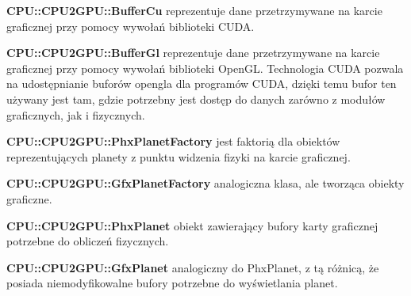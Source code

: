 \begin{description}
\item{\bf CPU::CPU2GPU::BufferCu} reprezentuje dane przetrzymywane na karcie graficznej przy pomocy wywołań biblioteki CUDA.
\item{\bf CPU::CPU2GPU::BufferGl} reprezentuje dane przetrzymywane na karcie graficznej przy pomocy wywołań biblioteki OpenGL. Technologia CUDA pozwala na udostępnianie buforów opengla dla programów CUDA, dzięki temu bufor ten używany jest tam, gdzie potrzebny jest dostęp do danych zarówno z modułów graficznych, jak i fizycznych.
\item{\bf CPU::CPU2GPU::PhxPlanetFactory} jest faktorią dla obiektów reprezentujących planety z punktu widzenia fizyki na karcie graficznej.
\item{\bf CPU::CPU2GPU::GfxPlanetFactory} analogiczna klasa, ale tworząca obiekty graficzne.
\item{\bf CPU::CPU2GPU::PhxPlanet} obiekt zawierający bufory karty graficznej potrzebne do obliczeń fizycznych.
\item{\bf CPU::CPU2GPU::GfxPlanet} analogiczny do PhxPlanet, z tą różnicą, że posiada niemodyfikowalne bufory potrzebne do wyświetlania planet.
\end{description}

